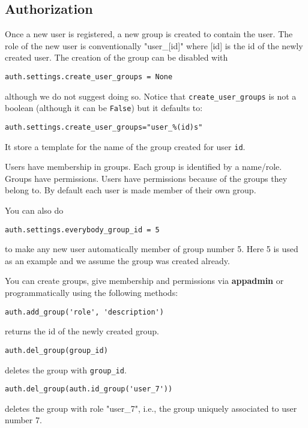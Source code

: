 \documentclass[justified,sixbynine,notoc]{tufte-book}
\def\ft{\small\tt}
\begin{document}
\begin{fullwidth}
\goodbreak\section{Authorization}

Once a new user is registered, a new group is created to contain the user. The role of the new user is conventionally "user\_[id]" where [id] is the id of the newly created user. The creation of the group can be disabled with
\begin{lstlisting}
auth.settings.create_user_groups = None
\end{lstlisting}
\noindent although we do not suggest doing so. Notice that {\ft create\_user\_groups} is not a boolean (although it can be {\ft False}) but it defaults to:

\begin{lstlisting}
auth.settings.create_user_groups="user_%(id)s"
\end{lstlisting}

It store a template for the name of the group created for user {\ft id}.

Users have membership in groups. Each group is identified by a name/role. Groups have permissions. Users have permissions because of the groups they belong to. By default each user is made member of their own group.

You can also do
\begin{lstlisting}
auth.settings.everybody_group_id = 5
\end{lstlisting}
\noindent to make any new user automatically member of group number 5. Here 5 is used as an example and we assume the group was created already.

You can create groups, give membership and permissions via {\bf appadmin}
or programmatically using the following methods:
\begin{lstlisting}
auth.add_group('role', 'description')
\end{lstlisting}
\noindent returns the id of the newly created group.

\begin{lstlisting}
auth.del_group(group_id)
\end{lstlisting}
\noindent deletes the group with {\ft group\_id}.

\begin{lstlisting}
auth.del_group(auth.id_group('user_7'))
\end{lstlisting}
\noindent deletes the group with role "user\_7", i.e., the group uniquely associated to user number 7.


\end{fullwidth}
\end{document}

